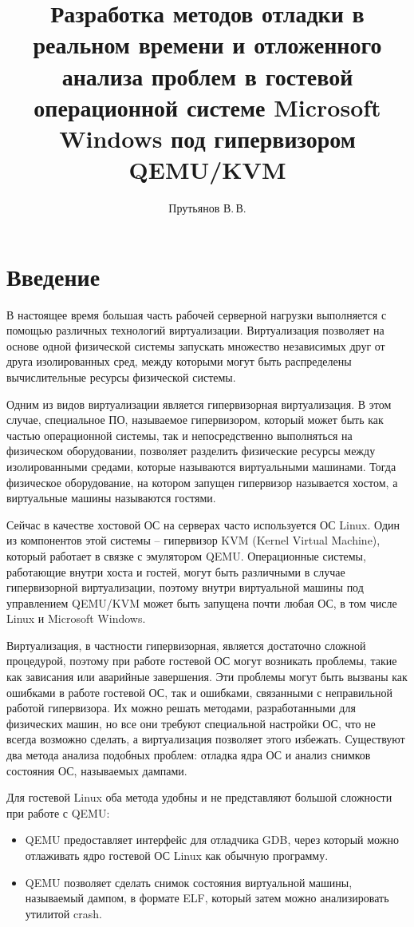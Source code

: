 \documentclass{mipt-thesis-bs}
\title{Разработка методов отладки в реальном времени и отложенного анализа проблем в гостевой операционной системе Microsoft Windows под гипервизором QEMU/KVM}
\author{Прутьянов В.\,В.}
\begin{document}
\titlecontents

\chapter{Введение}

В настоящее время большая часть рабочей серверной нагрузки выполняется с помощью различных технологий виртуализации\cite{server-trends}. Виртуализация позволяет на основе одной физической системы запускать множество независимых друг от друга изолированных сред, между которыми могут быть распределены вычислительные ресурсы физической системы.

Одним из видов виртуализации является гипервизорная виртуализация. В этом случае, специальное ПО, называемое гипервизором, который может быть как частью операционной системы, так и непосредственно выполняться на физическом оборудовании, позволяет разделить физические ресурсы между изолированными средами, которые называются виртуальными машинами\cite{t1}. Тогда физическое оборудование, на котором запущен гипервизор называется хостом, а виртуальные машины называются гостями.

Сейчас в качестве хостовой ОС на серверах часто используется ОС Linux. Один из компонентов этой системы -- гипервизор KVM (Kernel Virtual Machine), который работает в связке с эмулятором QEMU. Операционные системы, работающие внутри хоста и гостей, могут быть различными в случае гипервизорной виртуализации, поэтому внутри виртуальной машины под управлением QEMU/KVM может быть запущена почти любая ОС, в том числе Linux и Microsoft Windows.

Виртуализация, в частности гипервизорная, является достаточно сложной процедурой, поэтому при работе гостевой ОС могут возникать проблемы, такие как зависания или аварийные завершения. Эти проблемы могут быть вызваны как ошибками в работе гостевой ОС, так и ошибками, связанными с неправильной работой гипервизора. Их можно решать методами, разработанными для физических машин, но все они требуют специальной настройки ОС, что не всегда возможно сделать, а виртуализация позволяет этого избежать. Существуют два метода анализа подобных проблем: отладка ядра ОС и анализ снимков состояния ОС, называемых дампами.

Для гостевой Linux оба метода удобны и не представляют большой сложности при работе с QEMU:

\begin{itemize}
\item QEMU предоставляет интерфейс для отладчика GDB, через который можно отлаживать ядро гостевой ОС Linux как обычную программу\cite{qemu-gdb}.
\item QEMU позволяет сделать снимок состояния виртуальной машины, называемый дампом, в формате ELF, который затем можно анализировать утилитой crash.
\end{itemize}
\end{document}
